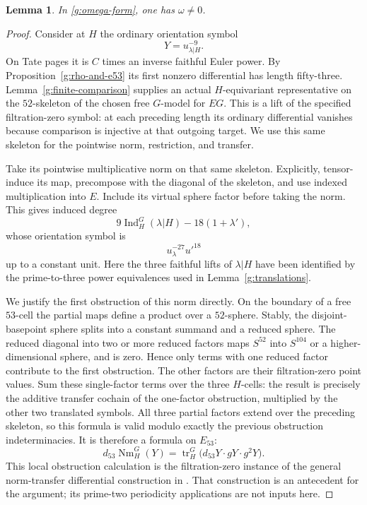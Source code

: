 \documentclass[11pt]{article}
\newtheorem{lemma}[theorem]{Lemma}
\theoremstyle{definition}
\theoremstyle{remark}
\numberwithin{equation}{section}
\begin{document}
\begin{lemma}\label{g:omega-norm}
In \eqref{g:omega-form}, one has $\omega\ne0$.
\end{lemma}

\begin{proof}
Consider at $H$ the ordinary orientation symbol
\[
 Y=u_{\lambda|H}^{-9}.
\]
On Tate pages it is $C$ times an inverse faithful
Euler power.  By Proposition~\ref{g:rho-and-e53} its
first nonzero differential has length fifty-three.
Lemma~\ref{g:finite-comparison} supplies an actual
$H$-equivariant representative on the $52$-skeleton
of the chosen free $G$-model for $EG$.
This is a lift of the specified filtration-zero symbol:
at each preceding length its ordinary differential
vanishes because comparison is injective at that
outgoing target.  We use this same skeleton for the
pointwise norm, restriction, and transfer.

Take its pointwise multiplicative norm on that same
skeleton.  Explicitly, tensor-induce its map, precompose
with the diagonal of the skeleton, and use indexed
multiplication into $E$.  Include its virtual sphere
factor before taking the norm.  This gives induced
degree
\[
 9\operatorname{Ind}_H^G(\lambda|H)
       -18(1+\lambda'),
\]
whose orientation symbol is
\[
 u_\lambda^{-27}u'^{18}
\]
up to a constant unit.  Here the three faithful lifts
of $\lambda|H$ have been identified by the prime-to-three
power equivalences used in Lemma~\ref{g:translations}.

We justify the first obstruction of this norm
directly.  On the boundary of a free $53$-cell the
partial maps define a product over a $52$-sphere.
Stably, the disjoint-basepoint sphere splits into a
constant summand and a reduced sphere.  The reduced
diagonal into two or more reduced factors maps
$S^{52}$ into $S^{104}$ or a higher-dimensional sphere,
and is zero.  Hence only terms with one reduced
factor contribute to the first obstruction.  The
other factors are their filtration-zero point values.
Sum these single-factor terms over the three
$H$-cells: the result is precisely the additive
transfer cochain of the one-factor obstruction,
multiplied by the other two translated symbols.
All three partial factors extend over the preceding
skeleton, so this formula is valid modulo exactly
the previous obstruction indeterminacies.  It is
therefore a formula on $E_{53}$:
\begin{equation}\label{g:norm-obstruction}
 d_{53}\operatorname{Nm}_H^G(Y)
 =\operatorname{tr}_H^G\bigl(d_{53}Y\cdot gY\cdot g^2Y\bigr).
\end{equation}
This local obstruction calculation is the filtration-zero
instance of the general norm-transfer differential
construction in \cite[Theorem~4.6 and
Proposition~5.4]{DHLLSWX}.  That construction is an
antecedent for the argument; its prime-two periodicity
applications are not inputs here.


\end{proof}
\end{document}
